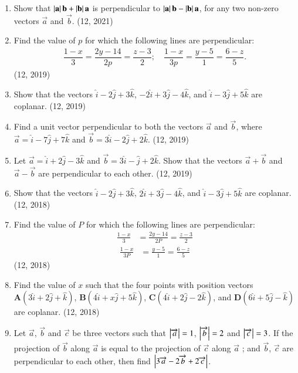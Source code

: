 \begin{enumerate}[label=\thesubsection.\arabic*, ref=\thesubsection.\theenumi]
%	
	\item Show that $\left\vert\mathbf{a}\right\vert \mathbf{b} + \left\vert\mathbf{b}\right\vert \mathbf{a}$ is perpendicular to $\left\vert\mathbf{a}\right\vert \mathbf{b} - \left\vert\mathbf{b}\right\vert \mathbf{a}$, for any two non-zero vectors $\vec{a}$ and $\vec{b}$. \hfill (12, 2021)
	\item Find the value of $p$ for which the following lines are perpendicular:
	\begin{align*}
	\dfrac{1-x}{3} = \dfrac{2y-14}{2p} = \dfrac{z-3}{2}; \quad \dfrac{1-x}{3p} = \dfrac{y-5}{1} = \dfrac{6-z}{5}.
	\end{align*} \hfill (12, 2019)
%	
	\item Show that the vectors $\hat{i} - 2\hat{j} + 3\hat{k}$, $-2\hat{i} + 3\hat{j} - 4\hat{k}$, and $\hat{i} - 3\hat{j} + 5\hat{k}$ are coplanar. \hfill (12, 2019)
	\item Find a unit vector perpendicular to both the vectors $\overrightarrow{a}$ and $\overrightarrow{b}$, where $\overrightarrow{a} = \hat{i} - 7\hat{j} + 7\hat{k}$ and $\overrightarrow{b} = 3\hat{i} - 2\hat{j} + 2\hat{k}$. \hfill (12, 2019)
	\item Let $\overrightarrow{a} = \hat{i} + 2\hat{j} - 3\hat{k}$ and $\overrightarrow{b} = 3\hat{i} - \hat{j} + 2\hat{k}$. Show that the vectors $\overrightarrow{a} + \overrightarrow{b}$ and $\overrightarrow{a} - \overrightarrow{b}$ are perpendicular to each other. \hfill (12, 2019)
\item Show that the vectors $\hat{i} - 2\hat{j} + 3\hat{k}$, $2\hat{i} + 3\hat{j} - 4\hat{k}$, and $\hat{i} - 3\hat{j} + 5\hat{k}$ are coplanar. \hfill (12, 2018)
\item Find the value of $P$ for which the following lines are perpendicular:
\begin{align*}
\frac{1 - x}{3} &= \frac{2y - 14}{2P} = \frac{z - 3}{2}
\end{align*}
\begin{align*}
\frac{1 - x}{3P} &= \frac{y - 5}{1} = \frac{6 - z}{5}
\end{align*}
\hfill (12, 2018)
\item Find the value of $x$ such that the four points with position vectors $\mathbf{A}(3\hat{i} + 2\hat{j} + \hat{k})$, $\mathbf{B}(4\hat{i} + x\hat{j} + 5\hat{k})$, $\mathbf{C}(4\hat{i} + 2\hat{j} - 2\hat{k})$, and $\mathbf{D}(6\hat{i} + 5\hat{j} - \hat{k})$ are coplanar. \hfill (12, 2018)
 \item Let $\overrightarrow{a}$, $\overrightarrow{b} $ and $\overrightarrow{c}$ be three vectors such that $\left\vert\overrightarrow{a}\right\vert=1$, $\left\vert\overrightarrow{b}\right\vert=2 $ and $\left\vert\overrightarrow{c}\right\vert=3$. If the projection of $\overrightarrow{b}$ along $\overrightarrow{a}$ is equal to the projection of $\overrightarrow{c}$ along $\overrightarrow{a}$ ; and $\overrightarrow{b}$, $\overrightarrow{c}$ are perpendicular to each other, then find $\left\vert3\overrightarrow{a}- 2\overrightarrow{b} +2\overrightarrow{c}\right\vert$.

\end{enumerate}

